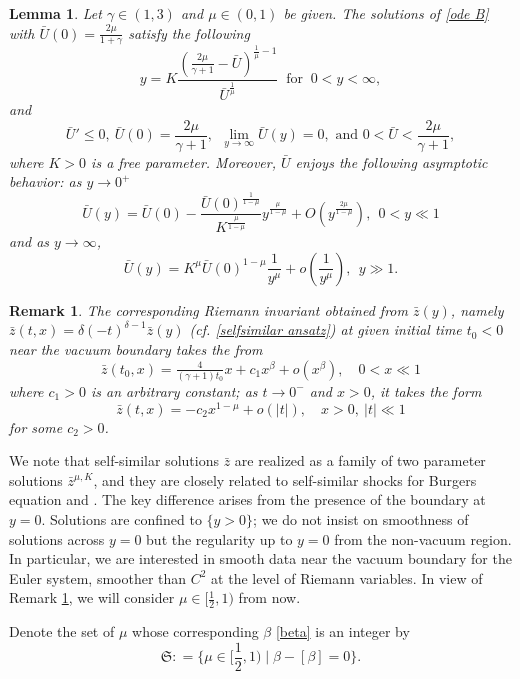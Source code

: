 \documentclass{article}
\newcommand{\ga}{\gamma}
\def\be{\begin{equation}}
\def\ee{\end{equation}}
\def\ssmu{\mathfrak S}
\numberwithin{equation}{section}
\newtheorem{lemma}[theorem]{Lemma}
\newtheorem{remark}[theorem]{Remark}
\begin{document}
\begin{lemma}
\label{lemma 3.4}  Let $\ga\in(1,3)$ and $\mu\in(0,1)$ be given. The solutions of \eqref{ode B} with $\bar U(0)= \frac{2\mu}{1+\gamma}$ satisfy the following 
\be\label{B formula}
y= K \frac{ ( \frac{2\mu}{\gamma+1} -\bar U)^{\frac{1}{\mu}-1}}{ \bar U^\frac{1}{\mu}}  \ \text{ for }  \ 0< y <\infty,  
\ee
and 
\be\label{B bc}
   \bar U' \leq 0, \ \bar U(0)= \frac{2\mu}{\gamma+1} , \  \ \lim_{y\to\infty} \bar U (y)  =0, \text{ and }  0< \bar U <  \frac{2\mu}{\gamma+1},
\ee
where $K>0$ is a free parameter. 
Moreover,  $\bar U$ enjoys the following asymptotic behavior: as $y\to 0^+$ 
\be\label{Asy at C}
\bar U (y) =  \bar U(0) - \frac{ \bar U(0)^\frac{1}{1-\mu}}{K^{\frac{\mu}{1-\mu}}} y^{\frac{\mu}{1-\mu}} + O (y^{\frac{2\mu}{1-\mu}} ),  \ \  0<y \ll 1
\ee
and as $y\to \infty$, 
\be\label{Asy at A}
\bar U(y) =  K^\mu  \bar U(0)^{1-\mu}\frac{1}{y^\mu} + o(\frac{1}{y^\mu}), \ \ y \gg  1  .
\ee
\end{lemma}
\begin{remark}\label{remark 2.3}
The corresponding Riemann invariant obtained from $\bar z(y)$, namely $\bar z(t,x) = \delta (-t)^{\delta-1} \bar z (y)  $ (cf. \eqref{selfsimilar ansatz})  %
 at given initial time $t_0<0$ %
 near the vacuum boundary   
takes the from 
$$ \bar z(t_0,x) =  \tfrac{4}{(\gamma+1)t_0} x + c_1 x^{\beta}+ o(x^{\beta}), \quad 0<x\ll 1 $$ 
where $c_1>0$ is an arbitrary constant; %
as $t\to 0^-$ and $x>0$, it takes the form $$ \bar z(t,x) = - c_2 x^{1-\mu} + o(|t|), \quad x>0, \ |t|\ll 1 $$
 for some $c_2>0$. 
 \end{remark}

We note that self-similar solutions $\bar z$ are realized as a family of two parameter solutions $\bar z^{\mu, K}$, and they are closely related to self-similar shocks for Burgers equation \cite{CGN18} and \cite{EF00}. The key difference arises from the presence of the boundary at $y=0$. Solutions are confined to $\{y>0\}$; we do not insist on smoothness of solutions across $y=0$ but the regularity up to $y=0$ from the non-vacuum region. In particular, we are interested in smooth data near the vacuum boundary for the Euler system, smoother than $C^2$ at the level of Riemann variables. In view of Remark \ref{remark 2.3}, we will consider $\mu \in [\frac12, 1)$ from now. 



Denote the set of $\mu$ whose corresponding $\beta$ \eqref{beta} is an integer by 
\be\label{def ssmu}
	\ssmu: = \{\mu\in[\frac12,1) \mid \beta-[\beta ]=0\}.
\ee
\end{document}
